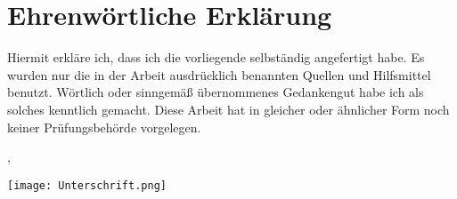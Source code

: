 
\section*{Ehrenwörtliche Erklärung}

Hiermit erkläre ich, dass ich die vorliegende \dokumententyp{} selbständig angefertigt habe. Es wurden nur die in der Arbeit ausdrücklich benannten Quellen und Hilfsmittel benutzt. Wörtlich oder sinngemäß übernommenes Gedankengut habe ich als solches kenntlich gemacht. Diese Arbeit hat in gleicher oder ähnlicher Form noch keiner Prüfungsbehörde vorgelegen.
\vspace{20mm}

\ort, \abgabedatum
\vspace{10mm}

\hspace*{-0.5cm}\texttt{[image: Unterschrift.png]}
\hspace{8cm}\\\dokumentenautor